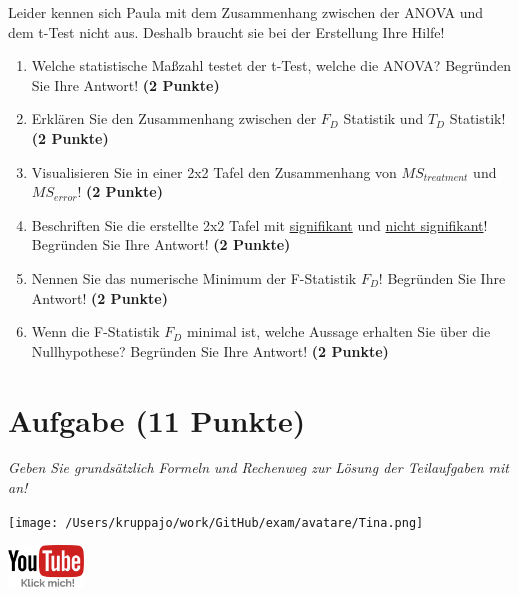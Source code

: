 \documentclass[a4paper, 9pt]{scrartcl}\usepackage[]{graphicx}\usepackage[]{xcolor}
\begin{document}
Leider kennen sich Paula mit dem Zusammenhang zwischen der ANOVA und dem t-Test nicht aus. Deshalb braucht sie bei der Erstellung Ihre Hilfe! 

\begin{enumerate}
\item Welche statistische Maßzahl testet der t-Test, welche die ANOVA? Begründen Sie Ihre Antwort! \textbf{(2 Punkte)}
\item Erklären Sie den Zusammenhang zwischen der $F_{D}$ Statistik und $T_{D}$ Statistik! \textbf{(2 Punkte)}
\item Visualisieren Sie in einer 2x2 Tafel den Zusammenhang von $MS_{treatment}$ und $MS_{error}$! \textbf{(2 Punkte)}
\item Beschriften Sie die erstellte 2x2 Tafel mit \underline{signifikant} und \underline{nicht signifikant}! Begründen Sie Ihre Antwort! \textbf{(2 Punkte)}
\item Nennen Sie das numerische Minimum der F-Statistik $F_D$! Begründen Sie Ihre Antwort! \textbf{(2 Punkte)}
\item Wenn die F-Statistik $F_D$ minimal ist, welche Aussage erhalten Sie über die Nullhypothese? Begründen Sie Ihre Antwort! \textbf{(2 Punkte)}
\end{enumerate}

 
\clearpage

\section{Aufgabe \hfill (11 Punkte)}

\textit{Geben Sie grundsätzlich Formeln und Rechenweg zur Lösung der Teilaufgaben mit an!} \\[1Ex]
 

 
\begin{minipage}[t]{0.5\textwidth}
\texttt{[image: /Users/kruppajo/work/GitHub/exam/avatare/Tina.png]}
\end{minipage}
\begin{minipage}[t]{0.5\textwidth}
\hfill
\href{https://youtu.be/2qG1Dws0MJo}{\includegraphics[width = 2cm]{img/youtube}}
\end{minipage}
\vspace{-3Ex}
\end{document}

